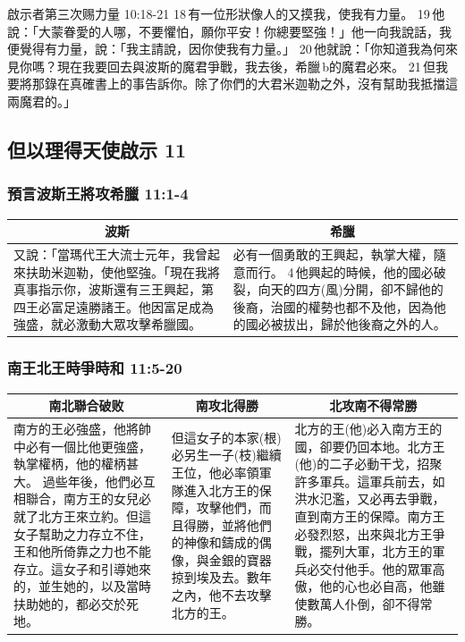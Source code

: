 啟示者第三次赐力量 10:18-21 
18 有一位形狀像人的又摸我，使我有力量。 19 他說：「大蒙眷愛的人哪，不要懼怕，願你平安！你總要堅強！」他一向我說話，我便覺得有力量，說：「我主請說，因你使我有力量。」 20 他就說：「你知道我為何來見你嗎？現在我要回去與波斯的魔君爭戰，我去後，希臘 b的魔君必來。 21 但我要將那錄在真確書上的事告訴你。除了你們的大君米迦勒之外，沒有幫助我抵擋這兩魔君的。」
\fi

\subsection{但以理得天使啟示 11}
\subsubsection{預言波斯王將攻希臘 11:1-4}
\begin{table}[H]
\centering
\begin{tabular}{p{8.25cm}|p{8.50cm}}\hline\hline
\multicolumn{1}{c|}{波斯}&\multicolumn{1}{c}{希臘}\\\hline
又說：「當瑪代王大流士元年，我曾起來扶助米迦勒，使他堅強。「現在我將真事指示你，波斯還有三王興起，第四王必富足遠勝諸王。他因富足成為強盛，就必激動大眾攻擊希臘國。
&必有一個勇敢的王興起，執掌大權，隨意而行。 4 他興起的時候，他的國必破裂，向天的四方(風)分開，卻不歸他的後裔，治國的權勢也都不及他，因為他的國必被拔出，歸於他後裔之外的人。\\\hline
\end{tabular}
\end{table}


\subsubsection{南王北王時爭時和 11:5-20}
\begin{table}[H]
\centering
\begin{tabular}{p{5.5cm}|p{4.50cm}|p{6.750cm}}\hline\hline
\multicolumn{1}{c|}{南北聯合破败}&\multicolumn{1}{c|}{南攻北得勝}&\multicolumn{1}{c}{北攻南不得常勝}\\\hline
南方的王必強盛，他將帥中必有一個比他更強盛，執掌權柄，他的權柄甚大。 過些年後，他們必互相聯合，南方王的女兒必就了北方王來立約。但這女子幫助之力存立不住，王和他所倚靠之力也不能存立。這女子和引導她來的，並生她的，以及當時扶助她的，都必交於死地。
&但這女子的本家(根)必另生一子(枝)繼續王位，他必率領軍隊進入北方王的保障，攻擊他們，而且得勝，並將他們的神像和鑄成的偶像，與金銀的寶器掠到埃及去。數年之內，他不去攻擊北方的王。 
&北方的王(他)必入南方王的國，卻要仍回本地。北方王(他)的二子必動干戈，招聚許多軍兵。這軍兵前去，如洪水氾濫，又必再去爭戰，直到南方王的保障。南方王必發烈怒，出來與北方王爭戰，擺列大軍，北方王的軍兵必交付他手。他的眾軍高傲，他的心也必自高，他雖使數萬人仆倒，卻不得常勝。\\\hline
\end{tabular}
\end{table}

